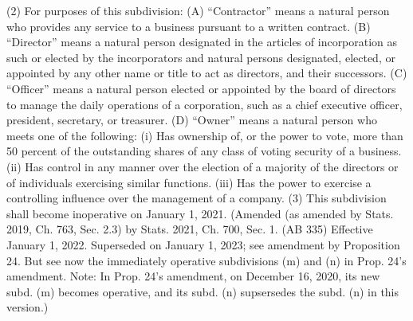 (2) For purposes of this subdivision:
(A) “Contractor” means a natural person who provides any service to a business pursuant to a written contract.
(B) “Director” means a natural person designated in the articles of incorporation as such or elected by the incorporators and natural persons designated, elected, or appointed by any other name or title to act as directors, and their successors.
(C) “Officer” means a natural person elected or appointed by the board of directors to manage the daily operations of a corporation, such as a chief executive officer, president, secretary, or treasurer.
(D) “Owner” means a natural person who meets one of the following:
(i) Has ownership of, or the power to vote, more than 50 percent of the outstanding shares of any class of voting security of a business.
(ii) Has control in any manner over the election of a majority of the directors or of individuals exercising similar functions.
(iii) Has the power to exercise a controlling influence over the management of a company.
(3) This subdivision shall become inoperative on January 1, 2021.
(Amended (as amended by Stats. 2019, Ch. 763, Sec. 2.3) by Stats. 2021, Ch. 700, Sec. 1. (AB 335) Effective January 1, 2022. Superseded on January 1, 2023; see amendment by Proposition 24. But see now the immediately operative subdivisions (m) and (n) in Prop. 24's amendment. Note: In Prop. 24's amendment, on December 16, 2020, its new subd. (m) becomes operative, and its subd. (n) supsersedes the subd. (n) in this version.)

